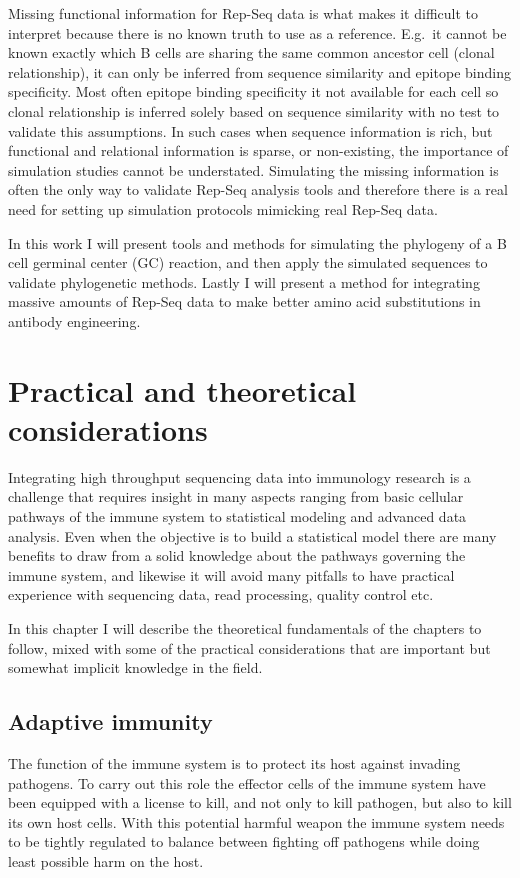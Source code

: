Missing functional information for Rep-Seq data is what makes it difficult to interpret because there is no known truth to use as a reference.
E.g.\ it cannot be known exactly which B cells are sharing the same common ancestor cell (clonal relationship), it can only be inferred from sequence similarity and epitope binding specificity.
Most often epitope binding specificity it not available for each cell so clonal relationship is inferred solely based on sequence similarity with no test to validate this assumptions.
In such cases when sequence information is rich, but functional and relational information is sparse, or non-existing, the importance of simulation studies cannot be understated.
Simulating the missing information is often the only way to validate Rep-Seq analysis tools and therefore there is a real need for setting up simulation protocols mimicking real Rep-Seq data.

In this work I will present tools and methods for simulating the phylogeny of a B cell germinal center (GC) reaction, and then apply the simulated sequences to validate phylogenetic methods. Lastly I will present a method for integrating massive amounts of Rep-Seq data to make better amino acid substitutions in antibody engineering.





\chapter{Practical and theoretical considerations}
Integrating high throughput sequencing data into immunology research is a challenge that requires insight in many aspects ranging from basic cellular pathways of the immune system to statistical modeling and advanced data analysis.
Even when the objective is to build a statistical model there are many benefits to draw from a solid knowledge about the pathways governing the immune system, and likewise it will avoid many pitfalls to have practical experience with sequencing data, read processing, quality control etc.

In this chapter I will describe the theoretical fundamentals of the chapters to follow, mixed with some of the practical considerations that are important but somewhat implicit knowledge in the field.





\section{Adaptive immunity}
The function of the immune system is to protect its host against invading pathogens.
To carry out this role the effector cells of the immune system have been equipped with a license to kill, and not only to kill pathogen, but also to kill its own host cells.
With this potential harmful weapon the immune system needs to be tightly regulated to balance between fighting off pathogens while doing least possible harm on the host.

